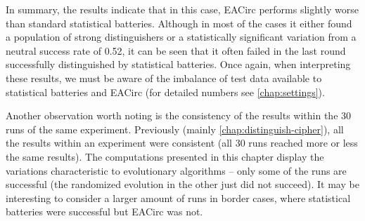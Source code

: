 \documentclass[12pt,oneside]{fithesis2}
\begin{document}
In summary, the results indicate that in this case, EACirc performs slightly worse than standard statistical batteries.
Although in most of the cases it either found a population of strong distinguishers or a statistically significant variation
from a neutral success rate of 0.52, it can be seen that it often failed in the last round successfully distinguished
by statistical batteries. Once again, when interpreting these results, we must be aware of the imbalance of test data
available to statistical batteries and EACirc (for detailed numbers see \autoref{chap:settings}).

Another observation worth noting is the consistency of the results within the 30 runs of the same experiment.
Previously (mainly \autoref{chap:distinguish-cipher}), all the results within an experiment were consistent 
(all 30 runs reached more or less the same results).
The computations presented in this chapter display the variations characteristic to evolutionary algorithms -- 
only some of the runs are successful (the randomized evolution in the other just did not succeed).
It may be interesting to consider a larger amount of runs in border cases, where statistical batteries were successful
but EACirc was not.
\end{document}
